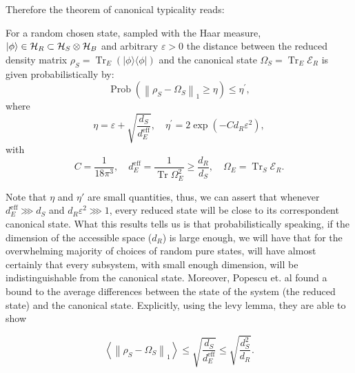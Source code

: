 \indent Therefore the theorem of canonical typicality reads:
\begin{theorem}
For a random chosen state, sampled with the Haar measure, $\mathinner{|{\phi}\rangle}\in\mathcal{H}_R\subset\mathcal{H}_S\otimes\mathcal{H}_B$ and arbitrary $\varepsilon >0$ the distance between the reduced density matrix $\rho_{S}=\operatorname{Tr}_{E}(|\phi\rangle\langle\phi|)$ and the canonical state $\Omega_S=\operatorname{Tr}_E\mathcal{E}_R$ is given probabilistically by:
\begin{equation}
\operatorname{Prob}\left(\left\|\rho_{S}-\Omega_{S}\right\|_{1} \geq \eta\right) \leq \eta^{\prime},
\label{CH1:Typicality_result_1}
\end{equation}
where
\begin{equation}
\eta=\varepsilon+\sqrt{\frac{d_{S}}{d_{E}^{\mathrm{eff}}}}, \quad \eta^{\prime}=2 \exp \left(-C d_{R} \varepsilon^{2}\right),
\label{CH1:Typicality_result_1_1}
\end{equation}
with
\begin{equation}
C=\frac{1}{18 \pi^{3}}, \quad d_{E}^{\mathrm{eff}}=\frac{1}{\operatorname{Tr} \Omega_{E}^{2}}\geq \frac{d_R}{d_S}, \quad \Omega_{E}=\operatorname{Tr}_{S} \mathcal{E}_{R}.
\label{CH1:Typicality_result_1_2}
\end{equation}
\end{theorem}

Note that $\eta$ and $\eta'$ are small quantities, thus, we can assert that whenever $d^{\mathrm{eff}}_E\ggg d_S$ and $d_R\varepsilon^2\ggg 1$, every reduced state will be close to its correspondent canonical state. What this results tells us is that probabilistically speaking, if the dimension of the accessible space ($d_R$) is large enough, we will have that for the overwhelming majority of choices of random pure states, will have almost certainly that every subsystem, with small enough dimension, will be indistinguishable from the canonical state. Moreover, Popescu et. al \cite{popescu_entanglement_2006} found a bound to the average differences between the state of the system (the reduced state) and the canonical state. Explicitly, using the levy lemma, they are able to show 

\begin{equation}
\left\langle\left\|\rho_{S}-\Omega_{S}\right\|_{1}\right\rangle \leq \sqrt{\frac{d_S}{d_E^{\mathrm{eff}}}}\leq\sqrt{\frac{d_{S}^{2}}{d_{R}}}.
\label{CH1:Typicality_result_2}
\end{equation}

